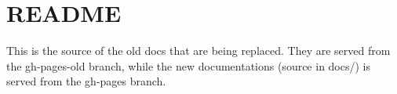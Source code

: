 \chapter{README}
\hypertarget{md_flatbuffers_2docs-old_2README}{}\label{md_flatbuffers_2docs-old_2README}
This is the source of the old docs that are being replaced. They are served from the {\ttfamily gh-\/pages-\/old} branch, while the new documentations (source in docs/) is served from the {\ttfamily gh-\/pages} branch. 